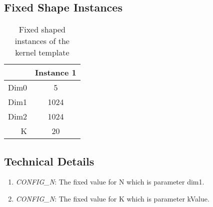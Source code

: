 \subsection{Fixed Shape Instances}
\begin{table}[htbp] %
\caption{Fixed shaped instances of the kernel template}
\label{tab:shapes_concat}
	\begin{center}
		\begin{tabular}{|r|c|} 
		\hline	
		  & Instance 1\\ 
		\hline	
		Dim0 &
			5 \\ 
		\hline
		Dim1 & 
			1024\\
		\hline
		Dim2 & 
			1024\\
		\hline
		K & 
			20\\
		\hline
		\end{tabular}
	\end{center}
\end{table}

\subsection{Technical Details}
\begin{enumerate}
\item \emph{CONFIG\_N}: The fixed value for N which is parameter dim1.
\item \emph{CONFIG\_N}: The fixed value for K which is parameter kValue.
\end{enumerate}
